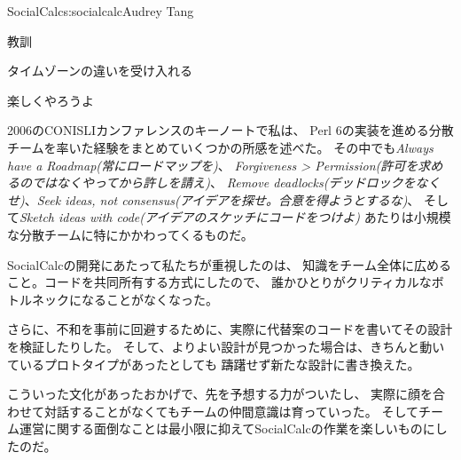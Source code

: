 \begin{aosachapter}{SocialCalc}{s:socialcalc}{Audrey Tang}
\begin{aosasect1}{教訓}
\begin{aosasect2}{タイムゾーンの違いを受け入れる}
\end{aosasect2}

\begin{aosasect2}{楽しくやろうよ}

2006のCONISLIカンファレンス\cite{bib:tang:fun}のキーノートで私は、
Perl 6の実装を進める分散チームを率いた経験をまとめていくつかの所感を述べた。
その中でも\emph{Always have a Roadmap(常にロードマップを)}、
\emph{Forgiveness {\textgreater} Permission(許可を求めるのではなくやってから許しを請え)}、
\emph{Remove deadlocks(デッドロックをなくせ)}、\emph{Seek ideas, not consensus(アイデアを探せ。合意を得ようとするな)}、
そして\emph{Sketch ideas with code(アイデアのスケッチにコードをつけよ)}
あたりは小規模な分散チームに特にかかわってくるものだ。

SocialCalcの開発にあたって私たちが重視したのは、
知識をチーム全体に広めること。コードを共同所有する方式にしたので、
誰かひとりがクリティカルなボトルネックになることがなくなった。

さらに、不和を事前に回避するために、実際に代替案のコードを書いてその設計を検証したりした。
そして、よりよい設計が見つかった場合は、きちんと動いているプロトタイプがあったとしても
躊躇せず新たな設計に書き換えた。

こういった文化があったおかげで、先を予想する力がついたし、
実際に顔を合わせて対話することがなくてもチームの仲間意識は育っていった。
そしてチーム運営に関する面倒なことは最小限に抑えてSocialCalcの作業を楽しいものにしたのだ。


\end{aosasect2}
\end{aosasect1}
\end{aosachapter}
